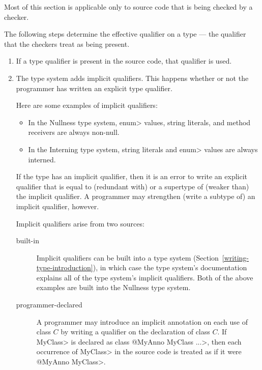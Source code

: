 Most of this section is applicable only to source code that is being
checked by a checker.

  The following steps determine the effective
qualifier on a type --- the qualifier that the checkers treat as being present.

\begin{enumerate}
\item
  If a type qualifier is present in the source code, that qualifier is used.

\item
  The type system adds implicit qualifiers.  This happens whether or not
  the programmer has written an explicit type qualifier.

  Here are some examples of implicit qualifiers:

\begin{itemize}
\item
  In the Nullness type system,
  \<enum> values, string literals, and method receivers are always non-null.
\item
  In the Interning type system, string literals
  and \<enum> values are always interned.
\end{itemize}

  If the type has an implicit qualifier, then it is an error to write an
  explicit qualifier that is equal to (redundant with) or a supertype of
  (weaker than) the implicit qualifier.  A programmer may strengthen
  (write a subtype of) an implicit qualifier, however.

  Implicit qualifiers arise from two sources:
\begin{description}
\item[built-in]
  Implicit qualifiers can be
  built into a type system (Section~\ref{writing-type-introduction}), in
  which case the type system's documentation explains all of the type
  system's implicit qualifiers.  Both of the above examples are built into
  the Nullness type system.
\item[programmer-declared]
  A programmer may introduce an implicit annotation on each use of class
  $C$ by writing a qualifier on the declaration of class $C$.  If \<MyClass>
  is declared as \<class @MyAnno MyClass \ttlcb...\ttrcb>, then each occurrence of
  \<MyClass> in the source code is treated as if it were \<@MyAnno
  MyClass>.
\end{description}




\end{enumerate}
